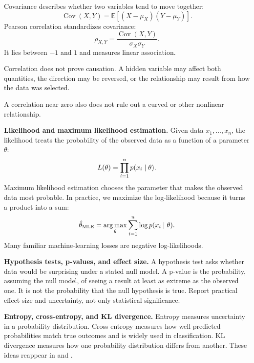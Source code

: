 Covariance describes whether two variables tend to move together:
\[
  \operatorname{Cov}(X,Y)=\mathbb{E}[(X-\mu_X)(Y-\mu_Y)].
\]
Pearson correlation standardizes covariance:
\[
  \rho_{X,Y}=\frac{\operatorname{Cov}(X,Y)}{\sigma_X\sigma_Y}.
\]
It lies between $-1$ and $1$ and measures linear association.

\begin{pitfall}
Correlation does not prove causation. A hidden variable may affect both quantities, the direction may be reversed, or the relationship may result from how the data was selected.
\end{pitfall}

A correlation near zero also does not rule out a curved or other nonlinear relationship.

\begin{optionaltopic}
\textbf{Likelihood and maximum likelihood estimation.} Given data $x_1,\ldots,x_n$, the likelihood treats the probability of the observed data as a function of a parameter $\theta$:
\[
L(\theta)=\prod_{i=1}^{n}p(x_i\mathrel{|}\theta).
\]
Maximum likelihood estimation chooses the parameter that makes the observed data most probable. In practice, we maximize the log-likelihood because it turns a product into a sum:
\[
\hat{\theta}_{\mathrm{MLE}}=\operatorname*{arg\,max}_{\theta}\sum_{i=1}^{n}\log p(x_i\mathrel{|}\theta).
\]
Many familiar machine-learning losses are negative log-likelihoods.
\end{optionaltopic}

\begin{optionaltopic}
\textbf{Hypothesis tests, p-values, and effect size.} A hypothesis test asks whether data would be surprising under a stated null model. A p-value is the probability, assuming the null model, of seeing a result at least as extreme as the observed one. It is not the probability that the null hypothesis is true. Report practical effect size and uncertainty, not only statistical significance.
\end{optionaltopic}

\begin{optionaltopic}
\textbf{Entropy, cross-entropy, and KL divergence.} Entropy measures uncertainty in a probability distribution. Cross-entropy measures how well predicted probabilities match true outcomes and is widely used in classification. KL divergence measures how one probability distribution differs from another. These ideas reappear in  and .
\end{optionaltopic}


